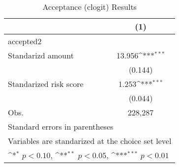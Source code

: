 \begin{table}[htbp]\centering
\def\sym#1{\ifmmode^{#1}\else\(^{#1}\)\fi}
\caption{Acceptance (clogit) Results}
\begin{tabular}{l*{1}{c}}
\hline\hline
                    &\multicolumn{1}{c}{(1)}         \\
\hline
accepted2           &                     \\
Standarizd amount   &      13.956\sym{***}\\
                    &     (0.144)         \\
[1em]
Standarized risk score&       1.253\sym{***}\\
                    &     (0.044)         \\
\hline
Obs.                &     228,287         \\
\hline\hline
\multicolumn{2}{l}{\footnotesize Standard errors in parentheses}\\
\multicolumn{2}{l}{\footnotesize Variables are standarized at the choice set level}\\
\multicolumn{2}{l}{\footnotesize \sym{*} \(p<0.10\), \sym{**} \(p<0.05\), \sym{***} \(p<0.01\)}\\
\end{tabular}
\end{table}
